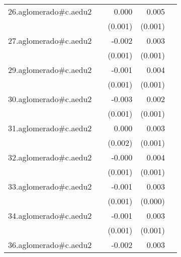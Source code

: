 {\begin{longtable}{l*{4}{D{.}{.}{-1}}}
\addlinespace
26.aglomerado#c.aedu2&                     &       0.000         &       0.005\sym{***}&                     \\
            &                     &     (0.001)         &     (0.001)         &                     \\
\addlinespace
27.aglomerado#c.aedu2&                     &      -0.002         &       0.003\sym{**} &                     \\
            &                     &     (0.001)         &     (0.001)         &                     \\
\addlinespace
29.aglomerado#c.aedu2&                     &      -0.001         &       0.004\sym{***}&                     \\
            &                     &     (0.001)         &     (0.001)         &                     \\
\addlinespace
30.aglomerado#c.aedu2&                     &      -0.003\sym{*}  &       0.002         &                     \\
            &                     &     (0.001)         &     (0.001)         &                     \\
\addlinespace
31.aglomerado#c.aedu2&                     &       0.000         &       0.003\sym{**} &                     \\
            &                     &     (0.002)         &     (0.001)         &                     \\
\addlinespace
32.aglomerado#c.aedu2&                     &      -0.000         &       0.004\sym{***}&                     \\
            &                     &     (0.001)         &     (0.001)         &                     \\
\addlinespace
33.aglomerado#c.aedu2&                     &      -0.001         &       0.003\sym{***}&                     \\
            &                     &     (0.001)         &     (0.000)         &                     \\
\addlinespace
34.aglomerado#c.aedu2&                     &      -0.001         &       0.003\sym{***}&                     \\
            &                     &     (0.001)         &     (0.001)         &                     \\
\addlinespace
36.aglomerado#c.aedu2&                     &      -0.002         &       0.003\sym{***}&                     \\

\end{longtable}}
